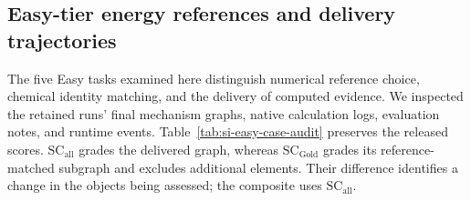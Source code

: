 \subsection{Easy-tier energy references and delivery trajectories}
\label{sec:si-easy-case-audit}

The five Easy tasks examined here distinguish numerical reference choice, chemical identity matching, and the delivery of computed evidence. We inspected the retained runs' final mechanism graphs, native calculation logs, evaluation notes, and runtime events. Table~\ref{tab:si-easy-case-audit} preserves the released scores. $\mathrm{SC}_{\mathrm{all}}$ grades the delivered graph, whereas $\mathrm{SC}_{\mathrm{Gold}}$ grades its reference-matched subgraph and excludes additional elements. Their difference identifies a change in the objects being assessed; the composite uses $\mathrm{SC}_{\mathrm{all}}$.

